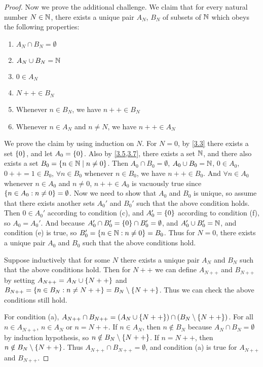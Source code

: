 \begin{proof}
	Now we prove the additional challenge.
	We claim that for every natural number \(N \in \mathbb{N}\), there exists a unique pair \(A_N\), \(B_N\) of subsets of \(\mathbb{N}\) which obeys the following properties:
	\begin{enumerate}
		\item \(A_N \cap B_N = \emptyset\)
		\item \(A_N \cup B_N = \mathbb{N}\)
		\item \(0 \in A_N\)
		\item \(N++ \in B_N\)
		\item Whenever \(n \in B_N\), we have \(n++ \in B_N\)
		\item Whenever \(n \in A_N\) and \(n \neq N\), we have \(n++ \in A_N\)
	\end{enumerate}

	We prove the claim by using induction on \(N\).
	For \(N = 0\), by \cref{3.3} there exists a set \(\left\lbrace0\right\rbrace\), and let \(A_0 = \left\lbrace0\right\rbrace\).
	Also by \cref{3.5,3.7}, there exists a set \(\mathbb{N}\), and there also exists a set \(B_0 = \left\lbrace n \in \mathbb{N} \mid n \neq 0\right\rbrace\).
	Then \(A_0 \cap B_0 = \emptyset\), \(A_0 \cup B_0 = \mathbb{N}\), \(0 \in A_0\), \(0++ = 1 \in B_0\), \(\forall n \in B_0\) whenever \(n \in B_0\), we have \(n++ \in B_0\).
	And \(\forall n \in A_0\) whenever \(n \in A_0\) and \(n \neq 0\), \(n++ \in A_0\) is vacuously true since \(\left\lbrace n \in A_0 : n \neq 0\right\rbrace = \emptyset\).
	Now we need to show that \(A_0\) and \(B_0\) is unique, so assume that there exists another sets \(A_0'\) and \(B_0'\) such that the above condition holds.
	Then \(0 \in A_0'\) according to condition (c), and \(A_0' = \left\lbrace0\right\rbrace\) according to condition (f), so \(A_0 = A_0'\).
	And because \(A_0' \cap B_0' = \left\lbrace0\right\rbrace \cap B_0' = \emptyset\), and \(A_0' \cup B_0' = \mathbb{N}\), and condition (e) is true, so \(B_0' = \left\lbrace n \in \mathbb{N} : n \neq 0\right\rbrace = B_0\).
	Thus for \(N = 0\), there exists a unique pair \(A_0\) and \(B_0\) such that the above conditions hold.

	Suppose inductively that for some \(N\) there exists a unique pair \(A_N\) and \(B_N\) such that the above conditions hold.
	Then for \(N++\) we can define \(A_{N++}\) and \(B_{N++}\) by setting \(A_{N++} = A_N \cup \left\lbrace N++\right\rbrace\) and \(B_{N++} = \left\lbrace n \in B_N : n \neq N++\right\rbrace = B_N \setminus \left\lbrace N++\right\rbrace\).
	Thus we can check the above conditions still hold.

	For condition (a), \(A_{N++} \cap B_{N++} = (A_N \cup \left\lbrace N++\right\rbrace) \cap (B_N \setminus \left\lbrace N++\right\rbrace)\).
	For all \(n \in A_{N++}\), \(n \in A_N\) or \(n = N++\).
	If \(n \in A_N\), then \(n \notin B_N\) because \(A_N \cap B_N = \emptyset\) by induction hypothesis, so \(n \notin B_N \setminus \left\lbrace N++\right\rbrace\).
	If \(n = N++\), then \(n \notin B_N \setminus \left\lbrace N++\right\rbrace\).
	Thus \(A_{N++} \cap B_{N++} = \emptyset\), and condition (a) is true for \(A_{N++}\) and \(B_{N++}\).


\end{proof}
